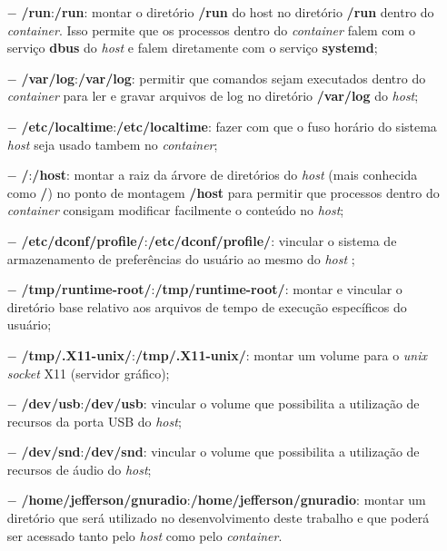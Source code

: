 \documentclass[
  12pt,				%
  openright,			%
  twoside,			%
  a4paper,			%
  english,			%
  french,				%
  spanish,			%
  brazil,				%
  ]{abntex2}
\begin{document}
\begin{itemize}
  \item[$-$] \textbf{/run}:\textbf{/run}: montar o diretório \textbf{/run} do host no diretório \textbf{/run} dentro do \textit{container}. Isso permite que os processos dentro do
        \textit{container} falem com o serviço \textbf{dbus} do \textit{host} e falem diretamente com o serviço \textbf{systemd};

  \item[$-$] \textbf{/var/log}:\textbf{/var/log}: permitir que comandos sejam executados dentro do \textit{container} para ler e gravar arquivos de log no diretório
        \textbf{/var/log} do \textit{host};

  \item[$-$] \textbf{/etc/localtime}:\textbf{/etc/localtime}: fazer com que o fuso horário do sistema \textit{host} seja usado
        tambem no \textit{container};

  \item[$-$] \textbf{/}:\textbf{/host}: montar a raiz da árvore de diretórios do \textit{host} (mais conhecida como \textbf{/}) no  ponto
        de montagem \textbf{/host} para permitir que processos dentro do \textit{container} consigam modificar facilmente o conteúdo no \textit{host};

  \item[$-$] \textbf{/etc/dconf/profile/}:\textbf{/etc/dconf/profile/}: vincular o sistema de armazenamento de preferências do usuário ao mesmo do \textit{host} \cite{RHEL-dconf-profile:2020};

  \item[$-$] \textbf{/tmp/runtime-root/}:\textbf{/tmp/runtime-root/}: montar e vincular o diretório base relativo aos arquivos de
        tempo de execução específicos do usuário;

  \item[$-$] \textbf{/tmp/.X11-unix/}:\textbf{/tmp/.X11-unix/}: montar um volume para o \textit{unix socket} X11 (servidor gráfico);

  \item[$-$] \textbf{/dev/usb}:\textbf{/dev/usb}: vincular o volume que possibilita a utilização de recursos da porta USB do \textit{host};

  \item[$-$] \textbf{/dev/snd}:\textbf{/dev/snd}: vincular o volume que possibilita a utilização de recursos de áudio do \textit{host};

  \item[$-$] \textbf{/home/jefferson/gnuradio}:\textbf{/home/jefferson/gnuradio}: montar um diretório que será utilizado no desenvolvimento
        deste trabalho e que poderá ser acessado tanto pelo \textit{host} como pelo \textit{container}.
\end{itemize}
\end{document}
